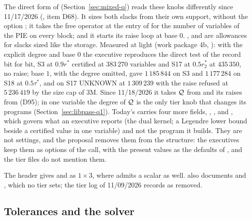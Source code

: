The direct form  of  (Section~\ref{sec:mixed-q}) reads these knobs differently since 11/17/2026 (, item D68). It sizes both slacks from their own support, without the option ; it takes the free operator at the entry of  for the number of variables of the PIE on every block; and it starts its raise loop at base $0$. ,  and  are allowances for slacks sized like the storage. Measured at light (work package 4b, ): with the explicit degree and base $0$ the executive reproduces the direct test of the record bit for bit, S3 at $0.9r^*$ certified at $383\,270$ variables and S17 at $0.5r_2^*$ at $435\,350$, no raise; base $1$, with the degree omitted, gave $1\,185\,844$ on S3 and $1\,177\,284$ on S18 at $0.5\tau^*$, and on S17 UNKNOWN at $1\,309\,239$ with the raise refused at $5\,236\,419$ by the size cap of $3$M. Since 11/18/2026 it takes $\mathcal{Q}$ from  and its raises from  (D95); in one variable the degree of $\mathcal{Q}$ is the only tier knob that changes its programs (Section~\ref{sec:libpass-q1}).
Today's  carries four more fields, , ,  and , which govern what an executive reports (the dual kernel; a Legendre lower bound beside a certified value in one variable) and not the program it builds. They are not settings, and the proposal removes them from the structure: the executives keep them as options of the call, with the present values as the defaults of , and the tier files do not mention them.

The  header gives  and  as $1\times3$, where  admits a scalar as well.  also documents  and , which no tier sets; the tier log of 11/09/2026 records  as removed.

\subsection{Tolerances and the solver}\label{sec:other-settings}

